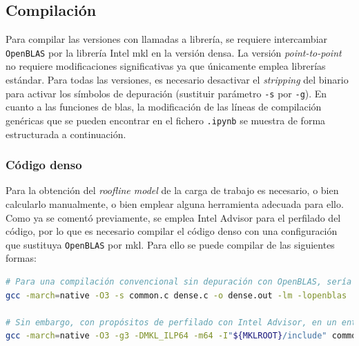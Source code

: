 \subsection{Compilación}
\label{ssec:compilacion_metodologia}
Para compilar las versiones con llamadas a librería, se requiere intercambiar \texttt{OpenBLAS} por la librería Intel \acrshort{mkl} en la versión densa. La versión \textit{point-to-point} no requiere modificaciones significativas ya que únicamente emplea librerías estándar. Para todas las versiones, es necesario desactivar el \textit{stripping} del binario para activar los símbolos de depuración (sustituir parámetro \texttt{-s} por \texttt{-g}). En cuanto a las funciones de \acrshort{blas}, la modificación de las líneas de compilación genéricas que se pueden encontrar en el fichero \texttt{.ipynb} se muestra de forma estructurada a continuación.

\subsubsection{Código denso}
Para la obtención del \textit{roofline model} de la carga de trabajo es necesario, o bien calcularlo manualmente, o bien emplear alguna herramienta adecuada para ello. Como ya se comentó previamente, se emplea Intel Advisor para el perfilado del código, por lo que es necesario compilar el código denso con una configuración que sustituya \texttt{OpenBLAS} por \acrshort{mkl}. Para ello se puede compilar de las siguientes formas:\medskip
\begin{lstlisting}[language=bash]
# Para una compilación convencional sin depuración con OpenBLAS, sería necesario únicamente ejecutar
gcc -march=native -O3 -s common.c dense.c -o dense.out -lm -lopenblas

# Sin embargo, con propósitos de perfilado con Intel Advisor, en un entorno bash donde se haya realizado `source /opt/intel/oneapi/setvar.sh` se ha de compilar con:
gcc -march=native -O3 -g3 -DMKL_ILP64 -m64 -I"${MKLROOT}/include" common.c dense.c -o dense.out -L${MKLROOT}/lib/intel64 -Wl,--no-as-needed -lmkl_intel_ilp64 -lmkl_gnu_thread -lmkl_core -lgomp -lpthread -lm -ldl
\end{lstlisting}

